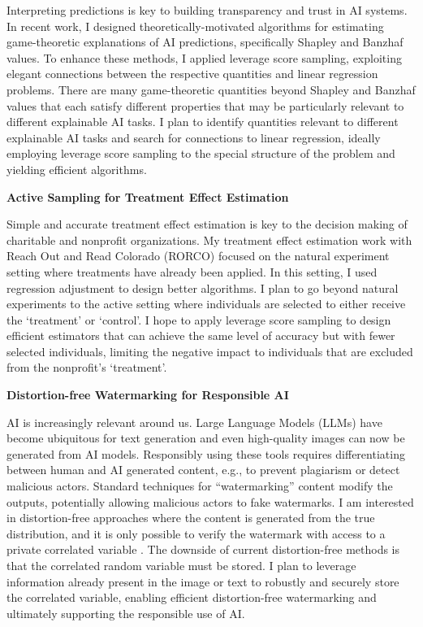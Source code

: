 \documentclass[11pt]{article}
\begin{document}
{Interpreting predictions is key to building transparency and trust in AI systems. In recent work, I designed theoretically-motivated algorithms for estimating game-theoretic explanations of AI predictions, specifically Shapley and Banzhaf values. To enhance these methods, I applied leverage score sampling, exploiting elegant connections between the respective quantities and linear regression problems. There are many game-theoretic quantities beyond Shapley and Banzhaf values that each satisfy different properties that may be particularly relevant to different explainable AI tasks. I plan to identify quantities relevant to different explainable AI tasks and search for connections to linear regression, ideally employing leverage score sampling to the special structure of the problem and yielding efficient algorithms.

{\large \textbf{Active Sampling for Treatment Effect Estimation}}

Simple and accurate treatment effect estimation is key to the decision making of charitable and nonprofit organizations. My treatment effect estimation work with Reach Out and Read Colorado (RORCO) focused on the natural experiment setting where treatments have already been applied. In this setting, I used regression adjustment to design better algorithms. I plan to go beyond natural experiments to the active setting where individuals are selected to either receive the ‘treatment’ or ‘control’. I hope to apply leverage score sampling to design efficient estimators that can achieve the same level of accuracy but with fewer selected individuals, limiting the negative impact to individuals that are excluded from the nonprofit’s `treatment’.

{\large \textbf{Distortion-free Watermarking for Responsible AI}}

AI is increasingly relevant around us. Large Language Models (LLMs) have become ubiquitous for text generation and even high-quality images can now be generated from AI models. Responsibly using these tools requires differentiating between human and AI generated content, e.g., to prevent plagiarism or detect malicious actors. Standard techniques for “watermarking” content modify the outputs, %
potentially allowing malicious actors to fake watermarks. I am interested in distortion-free approaches where the content is generated from the true distribution, and it is only possible to verify the watermark with access to a private correlated variable \cite{arabi2024hidden}. The downside of current distortion-free methods is that the correlated random variable must be stored. I plan to leverage information already present in the image or text to robustly and securely store the correlated variable, enabling efficient distortion-free watermarking and ultimately supporting the responsible use of AI.

}
\end{document}
